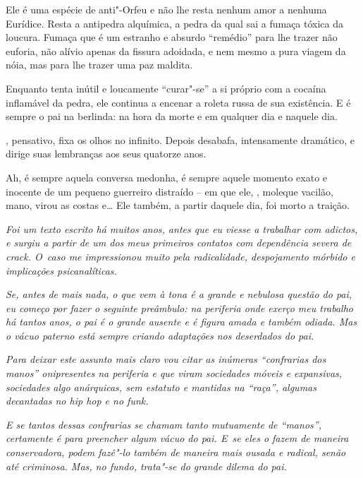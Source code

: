 Ele é uma espécie de anti"-Orfeu e não lhe resta nenhum amor a nenhuma
Eurídice. Resta a antipedra alquímica, a pedra da qual sai a fumaça
tóxica da loucura. Fumaça que é um estranho e absurdo ``remédio'' para
lhe trazer não euforia, não alívio apenas da fissura adoidada, e nem
mesmo a pura viagem da nóia, mas para lhe trazer uma paz maldita.

Enquanto  tenta inútil e loucamente ``curar"-se'' a si próprio com a
cocaína inflamável da pedra, ele continua a encenar a roleta russa de
sua existência. E é sempre o pai na berlinda: na hora da morte e em
qualquer dia e naquele dia.

, pensativo, fixa os olhos no infinito. Depois desabafa, intensamente
dramático, e dirige suas lembranças aos seus quatorze anos.

Ah, é sempre aquela conversa medonha, é sempre aquele momento exato e
inocente de um pequeno guerreiro distraído -- em que ele, , moleque
vacilão, mano, virou as costas e… Ele também, a partir daquele
dia, foi morto a traição.

\begin{center}\asterisc{}\end{center}


\emph{Foi um texto escrito há muitos anos, antes que eu viesse a
trabalhar com adictos, e surgiu a partir de um dos meus primeiros
contatos com dependência severa de crack. O~caso me impressionou muito
pela radicalidade, despojamento mórbido e implicações psicanalíticas.}~

\emph{Se, antes de mais nada, o que vem à tona é a grande e nebulosa
questão do pai, eu começo por fazer o seguinte preâmbulo: na periferia
onde exerço meu trabalho há tantos anos, o pai é o grande ausente e é
figura amada e também odiada. Mas o vácuo paterno está sempre criando
adaptações nos deserdados do pai.}~

\emph{Para deixar este assunto mais claro vou citar as inúmeras
``confrarias dos manos'' onipresentes na periferia e que viram
sociedades móveis e expansivas, sociedades algo anárquicas, sem estatuto
e mantidas na ``raça'', algumas decantadas no hip hop e no funk.}~

\emph{E se tantos dessas confrarias se chamam tanto mutuamente de
``manos'', certamente é para preencher algum vácuo do pai. E~se eles o
fazem de maneira conservadora, podem fazê"-lo também de maneira mais
ousada e radical, senão até criminosa. Mas, no fundo, trata"-se do grande
dilema do pai.}~

